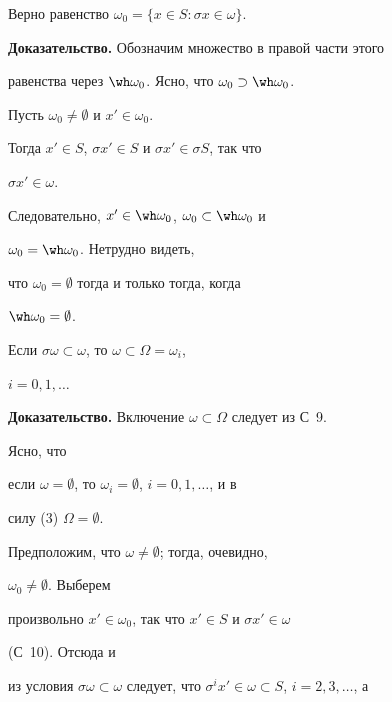  


\begin{pty} 


Верно равенство $\omega_0=\{x\in S:\sigma x\in\omega\}$. 


\end{pty} 


 


{\bf Доказательство.} Обозначим множество в правой части этого 


равенства через $\wh\omega_0$. Ясно, что $\omega_0\supset\wh\omega_0$. 


Пусть $\omega_0\ne\emptyset$ и $x'\in\omega_0$. 


Тогда $x'\in S$, $\sigma x'\in S$ и $\sigma x'\in\sigma S$, так что 


$\sigma x'\in\omega$. 


Следовательно, $x'\in\wh\omega_0$, $\omega_0\subset\wh\omega_0$ и 


$\omega_0=\wh\omega_0$. Нетрудно видеть, 


что $\omega_0=\emptyset$ тогда и только тогда, когда 


$\wh\omega_0=\emptyset$. 


 


\begin{pty} 


Если $\sigma\omega\subset\omega$, то $\omega\subset\Omega=\omega_i$, 


$i=0,1,\dotsc$ 


\end{pty} 


 


{\bf Доказательство.} Включение $\omega\subset\Omega$ следует из С~9. 


Ясно, что 


если $\omega=\emptyset$, то $\omega_i=\emptyset$, $i=0,1,\dotsc$, и в 


силу (3) $\Omega=\emptyset$. 


Предположим, что $\omega\ne\emptyset$; тогда, очевидно, 


$\omega_0\ne\emptyset$. Выберем 


произвольно $x'\in\omega_0$, так что $x'\in S$ и $\sigma x'\in\omega$ 


(С~10). Отсюда и 


из условия $\sigma\omega\subset\omega$ следует, что $\sigma^i 


x'\in\omega\subset S$, $i=2,3,\dotsc$, а 


